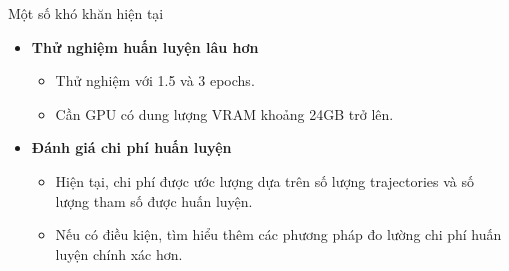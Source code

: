 \begin{frame}{Một số khó khăn hiện tại}

\begin{itemize}
    \item \textbf{Thử nghiệm huấn luyện lâu hơn}
    \begin{itemize}
        \item Thử nghiệm với 1.5 và 3 epochs.
        \item Cần GPU có dung lượng VRAM khoảng 24GB trở lên.
    \end{itemize}

    \vspace{0.3cm}

    \item \textbf{Đánh giá chi phí huấn luyện}
    \begin{itemize}
        \item Hiện tại, chi phí được ước lượng dựa trên số lượng
              trajectories và số lượng tham số được huấn luyện.
        \item Nếu có điều kiện, tìm hiểu thêm các phương pháp đo lường
              chi phí huấn luyện chính xác hơn.
    \end{itemize}
\end{itemize}

\end{frame}
